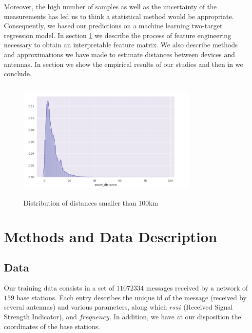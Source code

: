 \documentclass[twocolumn,2pt]{article}
\begin{document}
	Moreover, the high number of samples as well as the uncertainty of the measurements has led us to think a statistical method would be appropriate. Consequently, we based our predictions on a machine learning two-target regression model. In section \ref{methods} we describe the process of feature engineering necessary to obtain an interpretable feature matrix. We also describe methods and approximations we have made to estimate distances between devices and antennas. In section \label{results} we show the empirical results of our studies and then in \label{conclusion} we conclude.

	\begin{figure}[H]
		\includegraphics[width=9cm, height=6cm]{graphes/distance_distrib.png}
		\caption{Distribution of distances smaller than 100km}
		\label{distance_distrib}		
	\end{figure}
	\vspace{-20pt}


	\section{Methods and Data Description}
	\label{methods}
	\subsection{Data}
	Our training data consists in a set of $11 072 334$ messages received by a network of $159$ base stations. Each entry describes the unique id of the message (received by several antennas) and various parameters, along which $rssi$ (Received Signal Strength Indicator), and $frequency$. In addition, we have at our disposition the coordinates of the base stations.
	
\end{document}
